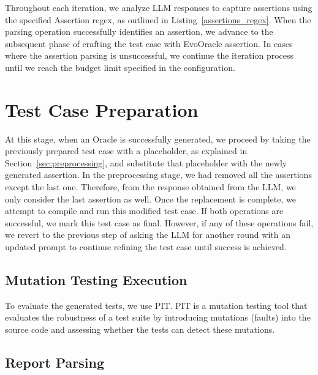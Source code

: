 Throughout each iteration, we analyze LLM responses to capture assertions using the specified Assertion regex, as outlined in Listing~\ref{assertions_regex}. When the parsing operation successfully identifies an assertion, we advance to the subsequent phase of crafting the test case with EvoOracle assertion. In cases where the assertion parsing is unsuccessful, we continue the iteration process until we reach the budget limit specified in the configuration. 

\section{Test Case Preparation}
\label{sec:test_case_preparation}
\vspace{0.2 cm}

At this stage, when an Oracle is successfully generated, we proceed by taking the previously prepared test case with a placeholder, as explained in Section~\ref{sec:preprocessing}, and substitute that placeholder with the newly generated assertion. In the preprocessing stage, we had removed all the assertions except the last one. Therefore, from the response obtained from the LLM, we only consider the last assertion as well. Once the replacement is complete, we attempt to compile and run this modified test case. If both operations are successful, we mark this test case as final. However, if any of these operations fail, we revert to the previous step of asking the LLM for another round with an updated prompt to continue refining the test case until success is achieved.

\vspace{0.1 cm}
\subsection{Mutation Testing Execution}
\label{sec:mutation_testing_execution}
\vspace{0.1 cm}

To evaluate the generated tests, we use PIT\cite{noauthor_pit_nodate}. PIT is a mutation testing tool that evaluates the robustness of a test suite by introducing mutations (faults) into the source code and assessing whether the tests can detect these mutations.

\vspace{0.1 cm}
\subsection{Report Parsing}
\label{sec:report_parsing}
\vspace{0.1 cm}

